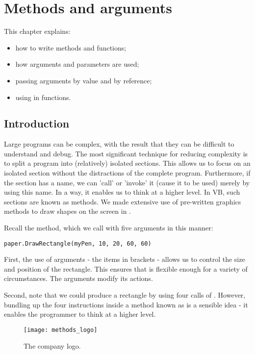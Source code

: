 \chapter{Methods and arguments}
	\label{ch:methods-arguments}

	This chapter explains:
	\begin{itemize}
		\item how to write methods and functions;
		\item how arguments and parameters are used;
		\item passing arguments by value and by reference;
		\item using  in functions.
	\end{itemize}

	\section{Introduction}
		Large programs can be complex, with the result that they can be difficult to understand and debug. The most significant technique for reducing complexity is to split a program into (relatively) isolated sections. This allows us to focus on an isolated section without the distractions of the complete program. Furthermore, if the section has a name, we can 'call' or 'invoke' it (cause it to be used) merely by using this name. In a way, it enables us to think at a higher level. In VB, such sections are known as methods. We made extensive use of pre-written graphics methods to draw shapes on the screen in .

		Recall the  method, which we call with five arguments in this manner:
		\begin{lstlisting}
paper.DrawRectangle(myPen, 10, 20, 60, 60)
		\end{lstlisting}
		
		First, the use of arguments - the items in brackets - allows us to control the size and position of the rectangle. This ensures that  is flexible enough for a variety of circumstances. The arguments modify its actions.
		
		Second, note that we could produce a rectangle by using four calls of . However, bundling up the four  instructions inside a method known as  is a sensible idea - it enables the programmer to think at a higher level.

		\begin{figure}[ht]
			\centering
			\texttt{[image: methods\_logo]}
			\caption{The company logo.}
			\label{fig:methods_logo}
		\end{figure}

